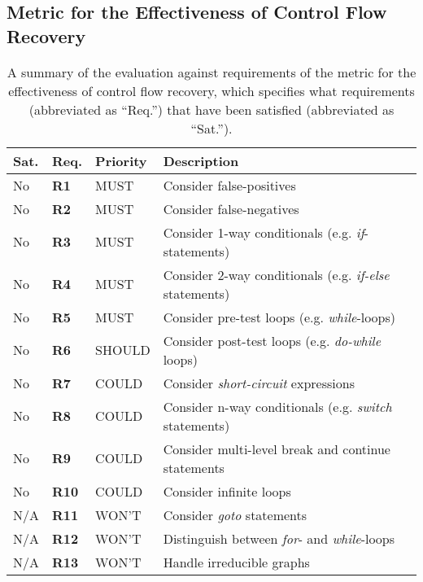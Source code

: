 
\subsection{Metric for the Effectiveness of Control Flow Recovery}
\label{sec:cfa_metric}



\begin{table}[htbp]
	\begin{center}
		\begin{tabular}{|l|l|l|l|}
			\hline
			Sat. & Req. & Priority & Description \\
			\hline
			\rowcolor{light_red_3}
			No & \textbf{R1} & MUST & Consider false-positives \\
			\rowcolor{light_red_3}
			No & \textbf{R2} & MUST & Consider false-negatives \\
			\rowcolor{light_red_3}
			No & \textbf{R3} & MUST & Consider 1-way conditionals (e.g. \textit{if}-statements) \\
			\rowcolor{light_red_3}
			No & \textbf{R4} & MUST & Consider 2-way conditionals (e.g. \textit{if-else} statements) \\
			\rowcolor{light_red_3}
			No & \textbf{R5} & MUST & Consider pre-test loops (e.g. \textit{while}-loops) \\
			\hline
			\rowcolor{light_red_3}
			No & \textbf{R6} & SHOULD & Consider post-test loops (e.g. \textit{do-while} loops) \\
			\hline
			\rowcolor{light_red_3}
			No & \textbf{R7} & COULD & Consider \textit{short-circuit} expressions \\
			\rowcolor{light_red_3}
			No & \textbf{R8} & COULD & Consider n-way conditionals (e.g. \textit{switch} statements) \\
			\rowcolor{light_red_3}
			No & \textbf{R9} & COULD & Consider multi-level break and continue statements \\
			\rowcolor{light_red_3}
			No & \textbf{R10} & COULD & Consider infinite loops \\
			\hline
			N/A & \textbf{R11} & WON'T & Consider \textit{goto} statements \\
			N/A & \textbf{R12} & WON'T & Distinguish between \textit{for}- and \textit{while}-loops \\
			N/A & \textbf{R13} & WON'T & Handle irreducible graphs \\
			\hline
		\end{tabular}
	\end{center}
	\caption{A summary of the evaluation against requirements of the metric for the effectiveness of control flow recovery, which specifies what requirements (abbreviated as ``Req.'') that have been satisfied (abbreviated as ``Sat.'').}
	\label{tbl:eval_summary_of_metric}
\end{table}
